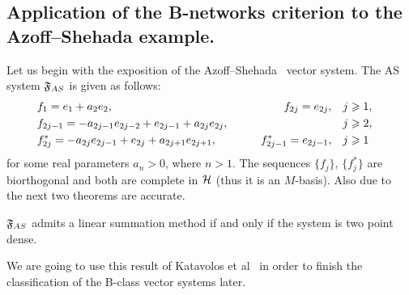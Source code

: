 \documentclass[12pt]{amsart}
\begin{document}
    \subsection{Application of the B-networks criterion to the Azoff--Shehada example.}
      Let us begin with the exposition of the Azoff--Shehada~\cite{azoff} vector system.
      The AS system $\fsys_{AS}$ is given as follows:
      \begin{equation}
        \label{as-system}
        \begin{aligned}
          &f_1 = e_1 + a_2 e_2, \qquad &f_{2j}=e_{2j}, \quad&j \geq 1,&\\
          &f_{2j-1}=-a_{2j-1}e_{2j-2} + e_{2j-1} + a_{2j}e_{2j}, \qquad &\makebox[5em]{} \quad&j \geq 2,&\\
          &f^*_{2j}=-a_{2j}e_{2j-1}+e_{2j}+a_{2j+1}e_{2j+1}, \qquad &f^*_{2j-1}=e_{2j-1}, \quad&j \geq 1&
        \end{aligned}
      \end{equation}
        for some real parameters $a_n > 0$, where $n > 1$.
      The sequences $\{f_j\}$, $\{f^*_j\}$ are biorthogonal and both are complete in $\cal{H}$ (thus it is an $M$-basis).
      Also due to~\cite{katavolos} the next two theorems are accurate.
      \begin{theorem}
        \label{thm-katavolos-1}
          $\fsys_{AS}$ admits a linear summation method if and only if the system is two point dense.
      \end{theorem}
      \begin{note}
        We are going to use this result of Katavolos et al~\cite{katavolos} in order to finish the classification of the B-class vector systems later.
      \end{note}
\end{document}
